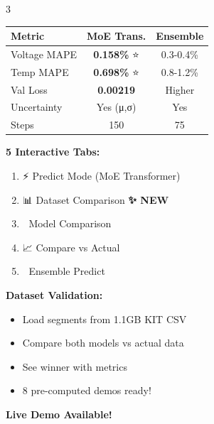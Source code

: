 \documentclass[final,a0paper,portrait]{a0poster}
\begin{document}
\begin{multicols}{3}
\columnbreak


\begin{bluebox}[title=📊 Performance Metrics]
\large
\begin{center}
\begin{tabular}{@{}lcc@{}}
\toprule
\textbf{Metric} & \textbf{MoE Trans.} & \textbf{Ensemble} \\
\midrule
Voltage MAPE & \textbf{0.158\%} ⭐ & 0.3-0.4\% \\
Temp MAPE & \textbf{0.698\%} ⭐ & 0.8-1.2\% \\
Val Loss & \textbf{0.00219} & Higher \\
Uncertainty & Yes (μ,σ) & Yes \\
Steps & 150 & 75 \\
\bottomrule
\end{tabular}
\end{center}
\end{bluebox}

\vspace{1cm}

\begin{orangebox}[title=🌐 Web Interface]
\large
\textbf{5 Interactive Tabs:}
\begin{enumerate}
    \item ⚡ Predict Mode (MoE Transformer)
    \item 📊 Dataset Comparison \textbf{✨ NEW}
    \item 🎯 Model Comparison
    \item 📈 Compare vs Actual
    \item 🔬 Ensemble Predict
\end{enumerate}

\textbf{Dataset Validation:}
\begin{itemize}
    \item Load segments from 1.1GB KIT CSV
    \item Compare both models vs actual data
    \item See winner with metrics
    \item 8 pre-computed demos ready!
\end{itemize}

\textbf{Live Demo Available!}
\end{orangebox}

\vspace{1cm}


\end{multicols}
\end{document}
